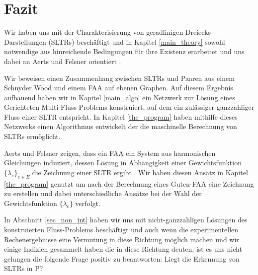\chapter{Fazit}

Wir haben uns mit der Charakterisierung von geradlinigen Dreiecks-Darstellungen (SLTRs) beschäftigt und in Kapitel \ref{main_theory} sowohl notwendige aus hinreichende Bedingungen für ihre Existenz erarbeitet und uns dabei an Aerts und Felsner orientiert \cite{af15}.

Wir beweisen einen Zusammenhang zwischen SLTRs und Paaren aus einem Schnyder Wood und einem FAA auf ebenen Graphen. Auf diesem Ergebnis aufbauend haben wir in Kapitel \ref{main_algo} ein Netzwerk zur Lösung eines Gerichteten-Multi-Fluss-Problems konstruiert, auf dem ein zulässiger ganzzahliger Fluss einer SLTR entspricht. In Kapitel \ref{the_program} haben mithilfe dieses Netzwerks einen Algorithmus entwickelt der die maschinelle Berechnung von SLTRs ermöglicht.

Aerts und Felsner zeigen, dass ein FAA ein System aus harmonischen Gleichungen induziert, dessen Lösung in Abhängigkeit einer Gewichtsfunktion $\{\lambda_e\}_{e\in E}$ die Zeichnung einer SLTR ergibt \cite{af13}. Wir haben diesen Ansatz in Kapitel \ref{the_program} genutzt um nach der Berechnung eines Guten-FAA eine Zeichnung zu erstellen und dabei unterschiedliche Ansätze bei der Wahl der Gewichtsfunktion $\{\lambda_e\}$ verfolgt.

In Abschnitt \ref{sec_non_int} haben wir uns mit nicht-ganzzahligen Lösungen des konstruierten Fluss-Problems beschäftigt und auch wenn die experimentellen Rechenergebnisse eine Vermutung in diese Richtung möglich machen und wir einige Indizien gesammelt haben die in diese Richtung deuten, ist es uns nicht gelungen die folgende Frage positiv zu beantworten: Liegt die Erkennung von SLTRs in P?